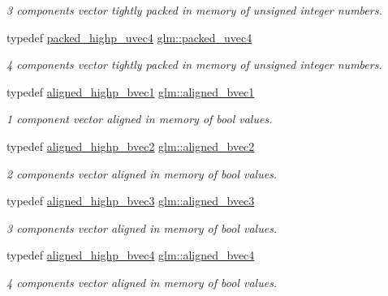 \begin{DoxyCompactItemize}
\begin{DoxyCompactList}\small\item\em 3 components vector tightly packed in memory of unsigned integer numbers. \end{DoxyCompactList}\item 
typedef \hyperlink{group__gtc__type__aligned_ga769bab317264c023f8ee77897e4b5894}{packed\+\_\+highp\+\_\+uvec4} \hyperlink{group__gtc__type__aligned_ga32a9f8facf5745a6513186ce61122310}{glm\+::packed\+\_\+uvec4}
\begin{DoxyCompactList}\small\item\em 4 components vector tightly packed in memory of unsigned integer numbers. \end{DoxyCompactList}\item 
typedef \hyperlink{group__gtc__type__aligned_ga92b3b4333bdc881b8ae27414162df481}{aligned\+\_\+highp\+\_\+bvec1} \hyperlink{group__gtc__type__aligned_ga7db5fd015b60682f3fdfe9cab47188dd}{glm\+::aligned\+\_\+bvec1}
\begin{DoxyCompactList}\small\item\em 1 component vector aligned in memory of bool values. \end{DoxyCompactList}\item 
typedef \hyperlink{group__gtc__type__aligned_gafa71bded1fc2dd68608207de49a96870}{aligned\+\_\+highp\+\_\+bvec2} \hyperlink{group__gtc__type__aligned_ga58579cb7fcfb892d0ae1f085327ae2ca}{glm\+::aligned\+\_\+bvec2}
\begin{DoxyCompactList}\small\item\em 2 components vector aligned in memory of bool values. \end{DoxyCompactList}\item 
typedef \hyperlink{group__gtc__type__aligned_ga224220a3fc5e5220141a568270cfb405}{aligned\+\_\+highp\+\_\+bvec3} \hyperlink{group__gtc__type__aligned_ga853a573b554adb2181d9ca23907f8a85}{glm\+::aligned\+\_\+bvec3}
\begin{DoxyCompactList}\small\item\em 3 components vector aligned in memory of bool values. \end{DoxyCompactList}\item 
typedef \hyperlink{group__gtc__type__aligned_ga833e4cd7402677f8ca56795a12d8bec0}{aligned\+\_\+highp\+\_\+bvec4} \hyperlink{group__gtc__type__aligned_gaa62e46e15c76ced942cdeba89776c5f6}{glm\+::aligned\+\_\+bvec4}
\begin{DoxyCompactList}\small\item\em 4 components vector aligned in memory of bool values. \end{DoxyCompactList}\item 

\end{DoxyCompactItemize}
